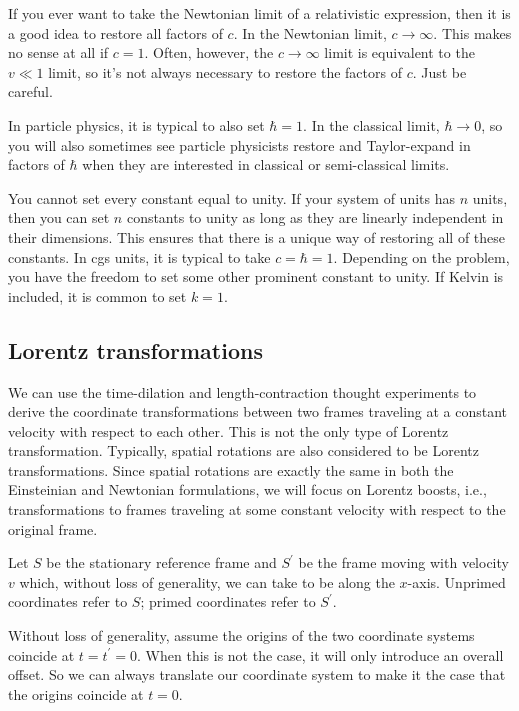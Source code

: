 \documentclass{article}
\begin{document}
If you ever want to take the Newtonian limit of a relativistic expression, then it is a good idea to restore all factors of $c$. In the Newtonian limit, $c \to \infty$. This makes no sense at all if $c = 1$. Often, however, the $c \to \infty$ limit is equivalent to the $v \ll 1$ limit, so it's not always necessary to restore the factors of $c$. Just be careful. 

In particle physics, it is typical to also set $\hbar = 1$. In the classical limit, $\hbar \to 0$, so you will also sometimes see particle physicists restore and Taylor-expand in factors of $\hbar$ when they are interested in classical or semi-classical limits.

You cannot set every constant equal to unity. If your system of units has $n$ units, then you can set $n$ constants to unity as long as they are linearly independent in their dimensions. This ensures that there is a unique way of restoring all of these constants. In cgs units, it is typical to take $c = \hbar = 1$. Depending on the problem, you have the freedom to set some other prominent constant to unity. If Kelvin is included, it is common to set $k = 1$.

\subsection*{Lorentz transformations}

We can use the time-dilation and length-contraction thought experiments to derive the coordinate transformations between two frames traveling at a constant velocity with respect to each other. This is not the only type of Lorentz transformation. Typically, spatial rotations are also considered to be Lorentz transformations. Since spatial rotations are exactly the same in both the Einsteinian and Newtonian formulations, we will focus on Lorentz boosts, i.e., transformations to frames traveling at some constant velocity with respect to the original frame.

Let $S$ be the stationary reference frame and $S^\prime $ be the frame moving with velocity $v$ which, without loss of generality, we can take to be along the $x$-axis. Unprimed coordinates refer to $S$; primed coordinates refer to $S^\prime$.

Without loss of generality, assume the origins of the two coordinate systems coincide at $t = t^\prime = 0$. When this is not the case, it will only introduce an overall offset. So we can always translate our coordinate system to make it the case that the origins coincide at $t = 0$.
\end{document}
